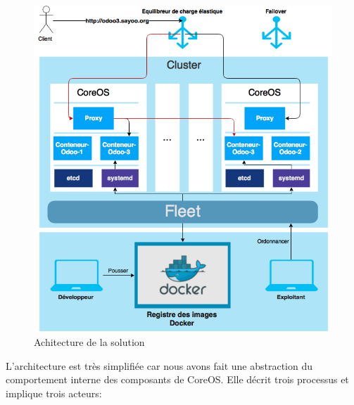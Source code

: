 \begin{onehalfspace}
\begin{figure}[H]
\centering
\includegraphics [scale=0.7]{chapitre4/assets/architecture}
\caption{Achitecture de la solution}
\label{fig:architecture}
\end{figure}

L'architecture est très simplifiée car nous avons fait une abstraction du comportement interne des composants de CoreOS. Elle décrit trois processus et implique trois acteurs:



\end{onehalfspace}
